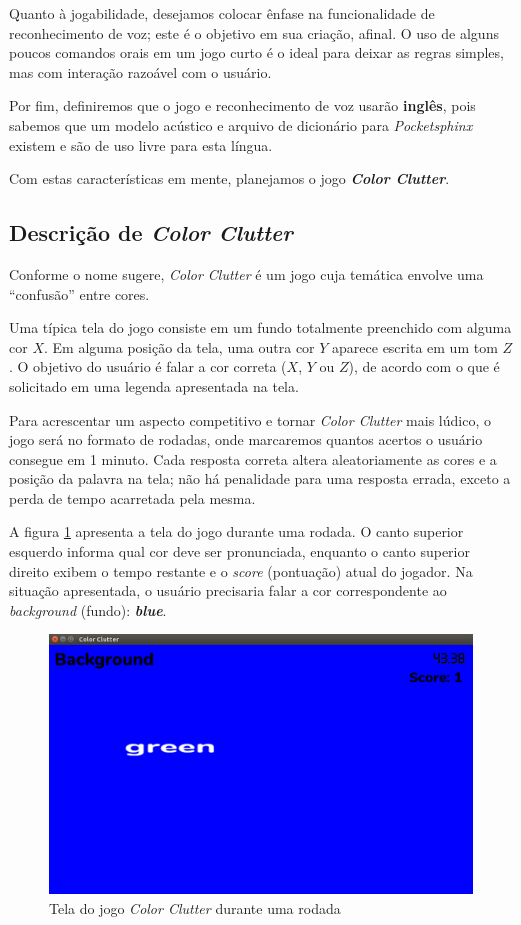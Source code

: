 Quanto à jogabilidade, desejamos colocar ênfase na funcionalidade de reconhecimento de voz; este é o objetivo em sua criação, afinal. O uso de alguns poucos comandos orais em um jogo curto é o ideal para deixar as regras simples, mas com interação razoável com o usuário.

Por fim, definiremos que o jogo e reconhecimento de voz usarão \textbf{inglês}, pois sabemos que um modelo acústico e arquivo de dicionário para \textit{Pocketsphinx} existem e são de uso livre para esta língua.

Com estas características em mente, planejamos o jogo \textbf{\emph{Color Clutter}}.


\subsection{Descrição de \textit{Color Clutter}}

Conforme o nome sugere, \textit{Color Clutter} é um jogo cuja temática envolve uma ``confusão'' entre cores.

Uma típica tela do jogo consiste em um fundo totalmente preenchido com alguma cor \(X\). Em alguma posição da tela, uma outra cor \(Y\) aparece escrita em um tom \(Z\). O objetivo do usuário é falar a cor correta (\(X\), \(Y\) ou \(Z\)), de acordo com o que é solicitado em uma legenda apresentada na tela.

Para acrescentar um aspecto competitivo e tornar \textit{Color Clutter} mais lúdico, o jogo será no formato de rodadas, onde marcaremos quantos acertos o usuário consegue em 1 minuto. Cada resposta correta altera aleatoriamente as cores e a posição da palavra na tela; não há penalidade para uma resposta errada, exceto a perda de tempo acarretada pela mesma.

A figura \ref{color-clutter-screen} apresenta a tela do jogo durante uma rodada. O canto superior esquerdo informa qual cor deve ser pronunciada, enquanto o canto superior direito exibem o tempo restante e o \textit{score} (pontuação) atual do jogador. Na situação apresentada, o usuário precisaria falar a cor correspondente ao \textit{background} (fundo): \textbf{\textit{blue}}.

\begin{figure}[H]
  \centering
  \includegraphics[width=.8\textwidth]{image/color-clutter-screen}
  \caption{Tela do jogo \textit{Color Clutter} durante uma rodada}
  \label{color-clutter-screen}
\end{figure}

